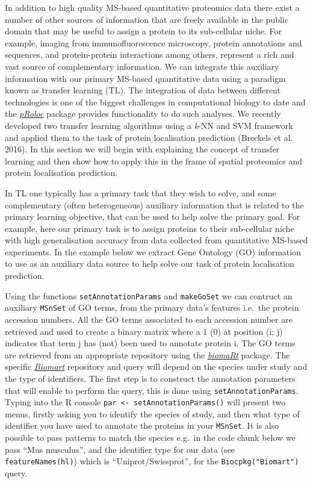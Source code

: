 In addition to high quality MS-based quantitative proteomics data there
exist a number of other sources of information that are freely available
in the public domain that may be useful to assign a protein to its
sub-cellular niche. For example, imaging from immunofluorescence
microscopy, protein annotations and sequences, and protein-protein
interactions among others, represent a rich and vast source of
complementary information. We can integrate this auxiliary information
with our primary MS-based quantitative data using a paradigm known as
transfer learning (TL). The integration of data between different
technologies is one of the biggest challenges in computational biology
to date and the
\emph{\href{http://bioconductor.org/packages/pRoloc}{pRoloc}} package
provides functionality to do such analyses. We recently developed two
transfer learning algorithms using a \emph{k}-NN and SVM framework and
applied them to the task of protein localisation prediction (Breckels et
al. 2016). In this section we will begin with explaining the concept of
transfer learning and then show how to apply this in the frame of
spatial proteomics and protein localisation prediction.

In TL one typically has a primary task that they wish to solve, and some
complementary (often heterogeneous) auxiliary information that is
related to the primary learning objective, that can be used to help
solve the primary goal. For example, here our primary task is to assign
proteins to their sub-cellular niche with high generalisation accuracy
from data collected from quantitative MS-based experiments. In the
example below we extract Gene Ontology (GO) information to use as an
auxiliary data source to help solve our task of protein localisation
prediction.

Using the functions \texttt{setAnnotationParams} and \texttt{makeGoSet}
we can contruct an auxiliary \texttt{MSnSet} of GO terms, from the
primary data's features i.e.~the protein accession numbers. All the GO
terms associated to each accession number are retrieved and used to
create a binary matrix where a 1 (0) at position (i; j) indicates that
term j has (not) been used to annotate protein i. The GO terms are
retrieved from an appropriate repository using the
\emph{\href{http://bioconductor.org/packages/biomaRt}{biomaRt}} package.
The specific
\emph{\href{http://bioconductor.org/packages/Biomart}{Biomart}}
repository and query will depend on the species under study and the type
of identifiers. The first step is to construct the annotation parameters
that will enable to perform the query, this is done using
\texttt{setAnnotationParams}. Typing into the R console
\texttt{par \textless{}- setAnnotationParams()} will present two menus,
firstly asking you to identify the species of study, and then what type
of identifier you have used to annotate the proteins in your
\texttt{MSnSet}. It is also possible to pass patterns to match the
species e.g.~in the code chunk below we pass ``Mus musculus'', and the
identifier type for our data (see \texttt{featureNames(hl)}) which is
``Uniprot/Swissprot'', for the \texttt{Biocpkg("Biomart")} query.

